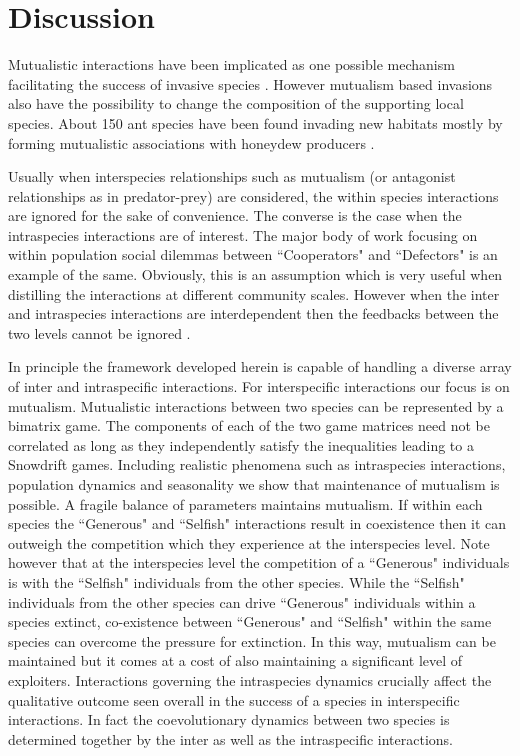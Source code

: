 \documentclass[12pt]{article}
\begin{document}
\section{Discussion}

Mutualistic interactions have been implicated as one possible mechanism facilitating the success of invasive species \citep{richardson:BR:2000}.
However mutualism based invasions also have the possibility to change the composition of the supporting local species.
About 150 ant species have been found invading new habitats mostly by forming mutualistic associations with honeydew producers \citep{mcglynn:JB:1999}.

Usually when interspecies relationships such as mutualism (or antagonist relationships as in predator-prey) are considered, the within species interactions are ignored for the sake of convenience.
The converse is the case when the intraspecies interactions are of interest.
The major body of work focusing on within population social dilemmas between ``Cooperators" and ``Defectors" is an example of the same.
Obviously, this is an assumption which is very useful when distilling the interactions at different community scales.
However when the inter and intraspecies interactions are interdependent then the feedbacks between the two levels cannot be ignored \citep{schluter:PlosB:2012}.

In principle the framework developed herein is capable of handling a diverse array of inter and intraspecific interactions.
For interspecific interactions our focus is on mutualism.
Mutualistic interactions between two species can be represented by a bimatrix game.
The components of each of the two game matrices need not be correlated as long as they independently satisfy the inequalities leading to a Snowdrift games. 
Including realistic phenomena such as intraspecies interactions, population dynamics and seasonality we show that maintenance of mutualism is possible.
A fragile balance of parameters maintains mutualism. 
If within each species the ``Generous" and ``Selfish" interactions result in coexistence then it can outweigh the competition which they experience at the interspecies level.
Note however that at the interspecies level the competition of a ``Generous" individuals is with the ``Selfish" individuals from the other species. 
While the ``Selfish" individuals from the other species can drive ``Generous" individuals within a species extinct, co-existence between ``Generous" and ``Selfish" within the same species can overcome the pressure for extinction. 
In this way, mutualism can be maintained but it comes at a cost of also maintaining a significant level of exploiters. 
Interactions governing the intraspecies dynamics crucially affect the qualitative outcome seen overall in the success of a species in interspecific interactions.
In fact the coevolutionary dynamics between two species is determined together by the inter as well as the intraspecific interactions.
\end{document}
